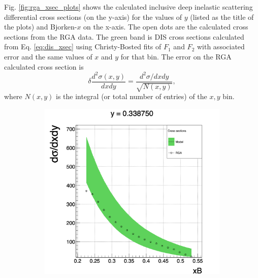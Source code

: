 Fig. \ref{fig:rga_xsec_plots} shows the calculated inclusive deep inelastic scattering differential cross sections (on the y-axis) for the values of $y$ (listed as the title of the plots) and Bjorken-$x$ on the x-axis. The open dots are the calculated cross sections from the RGA data. The green band is DIS cross sections calculated from Eq. \ref{eq:dis_xsec} using Christy-Bosted fits of $F_1$ and $F_2$ with associated error and the same values of $x$ and $y$ for that bin. The error on the RGA calculated cross section is
\begin{equation}
\delta \frac{d^2\sigma(x,y)}{dxdy} = \frac{d^2\sigma/dxdy}{\sqrt{N(x,y)}},
\end{equation}
where $N(x,y)$ is the integral (or total number of entries) of the $x,y$ bin.
 
\begin{figure}[h!]
	\centering
	\begin{subfigure}[b]{0.44\linewidth}
		\includegraphics[width=\linewidth]{figures/rga/xsec_0.png}
		\label{fig:rga_xsec0}
	\end{subfigure}
	\begin{subfigure}[b]{0.44\textwidth}

\end{subfigure}
\end{figure}
